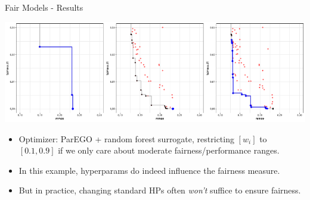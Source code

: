 \documentclass[11pt,compress,t,notes=noshow,xcolor=table]{beamer}
\begin{document}
\begin{vbframe}{Fair Models - Results}

\begin{center}
\includegraphics[scale=1.0]{figure_man/Pfisterer_et_al_2019_Multi_Objective_fig4.pdf}
\end{center}
\begin{itemize}
  \item Optimizer: ParEGO + random forest surrogate, restricting $[w_i]$ to $[0.1,0.9]$ if we only care about moderate fairness/performance ranges.
  \item In this example, hyperparams do indeed influence the fairness measure.
  \item But in practice, changing standard HPs often \emph{won’t} suffice to ensure fairness.
\end{itemize}

\end{vbframe}

\endlecture
\end{document}
